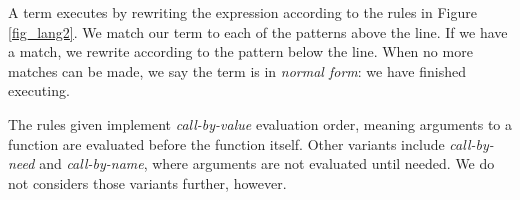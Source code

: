 \documentclass[12pt]{report}
\begin{document}
A \lamA term executes by rewriting the expression according to the
rules in Figure \ref{fig_lang2}. We match our term to each of the
patterns above the line. If we have a match, we rewrite according to
the pattern below the line. When no more matches can be made, we say
the term is in \emph{normal form}: we have finished executing.

The rules given implement \emph{call-by-value} evaluation order,
meaning arguments to a function are evaluated before the function
itself. Other variants include \emph{call-by-need} and
\emph{call-by-name}, where arguments are not evaluated until
needed. We do not considers those variants further, however.






\end{document}

